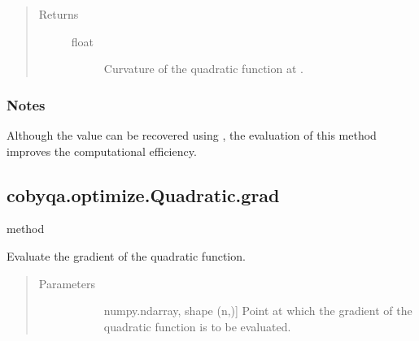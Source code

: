 \documentclass[letterpaper,10pt,english]{sphinxmanual}
\begin{document}
\begin{fulllineitems}
\begin{fulllineitems}
\begin{quote}
\begin{description}
\begin{description}
\end{description}

\item[{Returns}] \leavevmode\begin{description}
\item[{float}] \leavevmode
\sphinxAtStartPar
Curvature of the quadratic function at .

\end{description}

\end{description}\end{quote}
\subsubsection*{Notes}

\sphinxAtStartPar
Although the value can be recovered using {\hyperref[\detokenize{refs/generated/cobyqa.optimize.Quadratic.hessp:cobyqa.optimize.Quadratic.hessp}]{}}, the evaluation of
this method improves the computational efficiency.

\end{fulllineitems}



\subsection{cobyqa.optimize.Quadratic.grad}
\label{\detokenize{refs/generated/cobyqa.optimize.Quadratic.grad:cobyqa-optimize-quadratic-grad}}\label{\detokenize{refs/generated/cobyqa.optimize.Quadratic.grad::doc}}
\sphinxAtStartPar
method

\begin{fulllineitems}
\label{\detokenize{refs/generated/cobyqa.optimize.Quadratic.grad:cobyqa.optimize.Quadratic.grad}}
\sphinxAtStartPar
Evaluate the gradient of the quadratic function.
\begin{quote}\begin{description}
\item[{Parameters}] \leavevmode\begin{description}
\item[{}] \leavevmode{[}numpy.ndarray, shape (n,){]}
\sphinxAtStartPar
Point at which the gradient of the quadratic function is to be
evaluated.


\end{description}
\end{description}
\end{quote}
\end{fulllineitems}
\end{fulllineitems}
\end{document}

